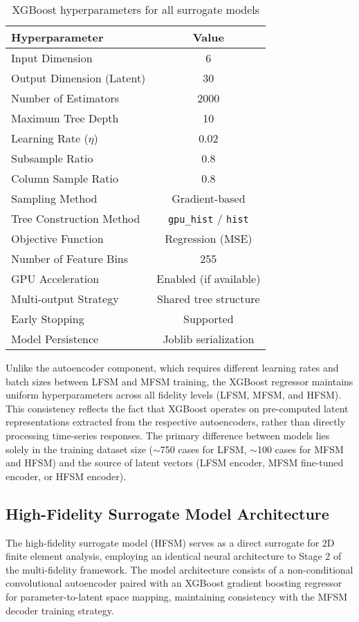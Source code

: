 \documentclass[12pt,a4paper]{report}
\begin{document}
\begin{table}[htbp]
\centering
\caption{XGBoost hyperparameters for all surrogate models}
\label{tab:xgb_hyperparameters}
\begin{tabular}{lc}
\hline
\textbf{Hyperparameter} & \textbf{Value} \\
\hline
Input Dimension & 6 \\
Output Dimension (Latent) & 30 \\
Number of Estimators & 2000 \\
Maximum Tree Depth & 10 \\
Learning Rate ($\eta$) & 0.02 \\
Subsample Ratio & 0.8 \\
Column Sample Ratio & 0.8 \\
Sampling Method & Gradient-based \\
Tree Construction Method & \texttt{gpu\_hist} / \texttt{hist} \\
Objective Function & Regression (MSE) \\
Number of Feature Bins & 255 \\
GPU Acceleration & Enabled (if available) \\
Multi-output Strategy & Shared tree structure \\
Early Stopping & Supported \\
Model Persistence & Joblib serialization \\
\hline
\end{tabular}
\end{table}

Unlike the autoencoder component, which requires different learning rates and batch sizes between LFSM and MFSM training, the XGBoost regressor maintains uniform hyperparameters across all fidelity levels (LFSM, MFSM, and HFSM). This consistency reflects the fact that XGBoost operates on pre-computed latent representations extracted from the respective autoencoders, rather than directly processing time-series responses. The primary difference between models lies solely in the training dataset size ($\sim$750 cases for LFSM, $\sim$100 cases for MFSM and HFSM) and the source of latent vectors (LFSM encoder, MFSM fine-tuned encoder, or HFSM encoder).


\subsection{High-Fidelity Surrogate Model Architecture}

The high-fidelity surrogate model (HFSM) serves as a direct surrogate for 2D finite element analysis, employing an identical neural architecture to Stage 2 of the multi-fidelity framework. The model architecture consists of a non-conditional convolutional autoencoder paired with an XGBoost gradient boosting regressor for parameter-to-latent space mapping, maintaining consistency with the MFSM decoder training strategy.
\end{document}
